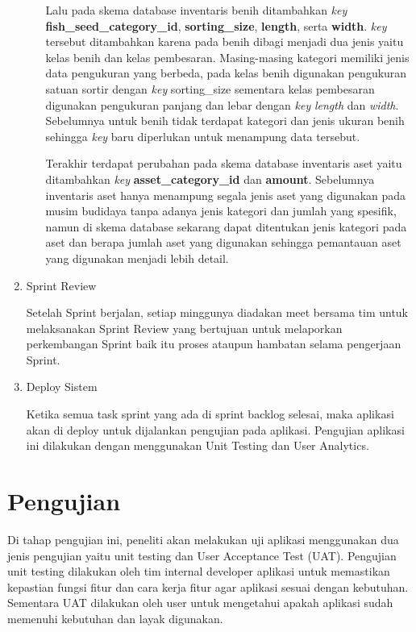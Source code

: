\begin{enumerate}
\begin{enumerate}
		Lalu pada skema database inventaris benih ditambahkan \textit{key} \textbf{fish\_seed\_category\_id}, \textbf{sorting\_size}, \textbf{length}, serta \textbf{width}. \textit{key} tersebut ditambahkan karena pada benih dibagi menjadi dua jenis yaitu kelas benih dan kelas pembesaran. Masing-masing kategori memiliki jenis data pengukuran yang berbeda, pada kelas benih digunakan pengukuran satuan sortir dengan \textit{key} sorting\_size sementara kelas pembesaran digunakan pengukuran panjang dan lebar dengan \textit{key} \textit{length} dan \textit{width}. Sebelumnya untuk benih tidak terdapat kategori dan jenis ukuran benih sehingga \textit{key} baru diperlukan untuk menampung data tersebut.

		Terakhir terdapat perubahan pada skema database inventaris aset yaitu ditambahkan \textit{key} \textbf{asset\_category\_id} dan \textbf{amount}. Sebelumnya inventaris aset hanya menampung segala jenis aset yang digunakan pada musim budidaya tanpa adanya jenis kategori dan jumlah yang spesifik, namun di skema database sekarang dapat ditentukan jenis kategori pada aset dan berapa jumlah aset yang digunakan sehingga pemantauan aset yang digunakan menjadi lebih detail.

	\end{enumerate}
	
	\item Sprint Review
	
	Setelah Sprint berjalan, setiap minggunya diadakan meet bersama tim untuk melaksanakan Sprint Review yang bertujuan untuk melaporkan perkembangan Sprint baik itu proses ataupun hambatan selama pengerjaan Sprint.
	
	\item Deploy Sistem
	
	Ketika semua task sprint yang ada di sprint backlog selesai, maka aplikasi akan di deploy untuk dijalankan pengujian pada aplikasi. Pengujian aplikasi ini dilakukan dengan menggunakan Unit Testing dan User Analytics.
	
\end{enumerate}

\section{Pengujian}

Di tahap pengujian ini, peneliti akan melakukan uji aplikasi menggunakan dua jenis pengujian yaitu unit testing dan User Acceptance Test (UAT). Pengujian unit testing dilakukan oleh tim internal developer aplikasi untuk memastikan kepastian fungsi fitur dan cara kerja fitur agar aplikasi sesuai dengan kebutuhan. Sementara UAT dilakukan oleh user untuk mengetahui apakah aplikasi sudah memenuhi kebutuhan dan layak digunakan.

